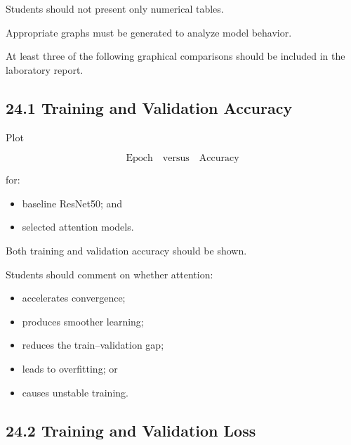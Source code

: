 \documentclass[10pt]{article}
\begin{document}
Students should not present only numerical tables.

Appropriate graphs must be generated to analyze model behavior.

At least three of the following graphical comparisons should be included in
the laboratory report.

\subsection*{24.1 Training and Validation Accuracy}

Plot

\[
\text{Epoch}
\quad\text{versus}\quad
\text{Accuracy}
\]

for:

\begin{itemize}

\item baseline ResNet50; and

\item selected attention models.

\end{itemize}

Both training and validation accuracy should be shown.

Students should comment on whether attention:

\begin{itemize}

\item accelerates convergence;

\item produces smoother learning;

\item reduces the train--validation gap;

\item leads to overfitting; or

\item causes unstable training.

\end{itemize}

\subsection*{24.2 Training and Validation Loss}
\end{document}
